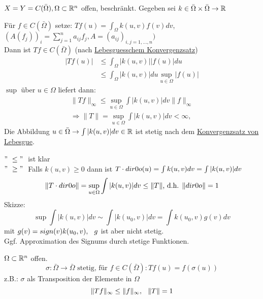 \begin{beispiel}[Integraloperator] 
	$X = Y = C(\bar \Omega), \Omega \subset \mathbb{R}^{n}$ offen, beschränkt.
	Gegeben sei $k \in \bar \Omega \times \bar \Omega \rightarrow \mathbb{R} $
	
	Für $f \in C(\bar \Omega)$ setze: $Tf(u) = \int_{\Omega} k(u, v) f(v) dv$, \hspace{0.25cm}
	$\left( A( f_{j} ) \right)_{i} = \sum_{j = 1}^{n} a_{ij}f_{j}, A = (a_{ij})_{i,j = 1, \dotsc, n} )$ \\
	
	Dann ist $Tf \in C(\bar \Omega)$ (nach \hyperref[satz:x-SatzvonLebesgue]{Lebesguesschem Konvergenzsatz})
	\begin{align*}
		|T f(u)| & \leq \int_{\Omega} |k(u, v)| |f(u)| du \\
				 & \leq \int_{\Omega} |k(u, v)| du \sup_{u \in \Omega} | f(u) |
	\end{align*} 				 
	$\sup$ über $u \in \Omega$ liefert dann:
	\begin{align*}
		\| Tf \|_{\infty} \leq \sup_{u \in \Omega} \int |k(u,v)| dv \| f \|_{\infty} \\
		\Rightarrow \| T \| = \sup_{u \in \Omega} \int |k(u, v)| dv < \infty,
	\end{align*} 	
	Die Abbildung $u \in \bar \Omega \rightarrow \int |k(u, v)| dv \in \mathbb{R}$ ist stetig nach dem \hyperref[satz:x-SatzvonLebesgue]{Konvergenzsatz von Lebesgue}. \\
	\begin{beweis}
		$ "\ \leq "\ $ ist klar \\
		$ "\ \geq "\ $ Falls $ k(u, v) \geq 0$ dann ist $T \cdot \1 (u) = \int k(u, v) dv = \int |k(u, v)| dv$ \\
		\[ \| T \cdot \1 \| = \sup_{u \in \Omega} \int |k(u, v)| dv \leq \| T \| \text{, d.h. } \| \1 \| = 1 \]
		Skizze:
		\[ \sup \int | k(u, v) | dv \sim \int | k(u_{0}, v) | dv = \int k(u_{0}, v) g(v) dv \]
		mit $g(v) = sign(v) k(u_{0}, v), \hspace{0.25cm} g$ ist aber nicht stetig. \\
		Ggf. Approximation des Signums durch stetige Funktionen.
	\end{beweis}
\end{beispiel}


\begin{beispiel}[Kompositionsoperator] 
$\Omega \subset \mathbb{R}^{n}$ offen. 
\[ \sigma \colon \bar \Omega \rightarrow \bar \Omega \text{ stetig, für } f \in C(\bar \Omega): Tf(u) = f(\sigma(u)) \]
z.B.: $\sigma$ als Transposition der Elemente in $\Omega$
\[ \| Tf \|_{\infty} \leq \| f \|_{\infty}, \hspace{0.25cm} \| T \| = 1 \]
\end{beispiel}

